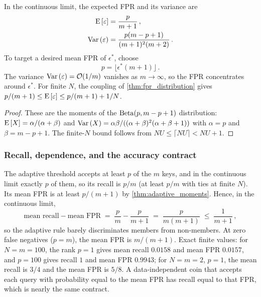 \begin{theorem}
\label{thm:adaptive_moments}
In the continuous limit, the expected FPR and its variance are
\begin{align}
\label{eq:adaptive_mean}
    \Expect{\fprate} &= \frac{p}{m + 1}\,, \\
\label{eq:adaptive_var}
    \Var{\fprate} &= \frac{p(m - p + 1)}{(m + 1)^2(m + 2)}\,.
\end{align}
To target a desired mean FPR of $\epsilon^{*}$, choose
\begin{equation}
\label{eq:adaptive_p_choice}
    p = \lfloor \epsilon^{*}(m + 1) \rfloor\,.
\end{equation}
The variance $\Var{\fprate} = \mathcal{O}(1/m)$ vanishes as $m \to \infty$,
so the FPR concentrates around $\epsilon^{*}$.
For finite $N$, the coupling of \cref{thm:fpr_distribution} gives
$p/(m+1) \leq \Expect{\fprate} \leq p/(m+1) + 1/N$.
\end{theorem}
\begin{proof}
These are the moments of the $\operatorname{Beta}(p, m - p + 1)$ distribution:
$\Expect{X} = \alpha / (\alpha + \beta)$ and
$\Var{X} = \alpha\beta / ((\alpha + \beta)^2(\alpha + \beta + 1))$
with $\alpha = p$ and $\beta = m - p + 1$.
The finite-$N$ bound follows from $NU \leq \lceil NU \rceil < NU + 1$.
\end{proof}

\subsubsection{Recall, dependence, and the accuracy contract}
\label{sec:adaptive_contract}

The adaptive threshold accepts at least $p$ of the $m$ keys, and in the
continuous limit exactly $p$ of them, so its recall is $p/m$ (at least $p/m$
with ties at finite $N$).
Its mean FPR is at least $p/(m+1)$ by \cref{thm:adaptive_moments}.
Hence, in the continuous limit,
\begin{equation}
\label{eq:adaptive_discrimination}
    \text{mean recall} - \text{mean FPR}
    \;=\; \frac{p}{m} - \frac{p}{m+1}
    \;=\; \frac{p}{m(m+1)} \;\leq\; \frac{1}{m+1}\,,
\end{equation}
so the adaptive rule barely discriminates members from non-members.
At zero false negatives ($p = m$), the mean FPR is $m/(m+1)$.
Exact finite values: for $N = m = 100$, the rank $p = 1$ gives mean recall
$0.0158$ and mean FPR $0.0157$, and $p = 100$ gives recall $1$ and mean FPR
$0.9943$; for $N = m = 2$, $p = 1$, the mean recall is $3/4$ and the mean FPR
is $5/8$.
A data-independent coin that accepts each query with probability equal to the
mean FPR has recall equal to that FPR, which is nearly the same contract.

